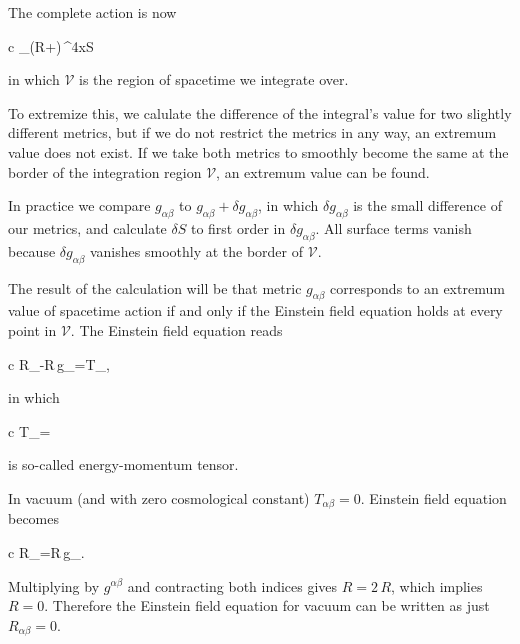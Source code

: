\documentclass[11pt,oneside%
]{memoir}
\newenvironment{eqna}{\begin{IEEEeqnarray*}{c}}{\end{IEEEeqnarray*}\ignorespacesafterend}
\newcommand{\dd}{\mathrm{d}}
\begin{document}
The complete action is now
\begin{eqna}
\int_(R+)\,\dd^4x\doteq S
\end{eqna}
in which \(\mathcal{V}\) is the region of spacetime we integrate over.


To extremize this, we calulate the difference of the integral's value for two slightly different metrics, but if we do not restrict the metrics in any way, an extremum value does not exist. If we take both metrics to smoothly become the same at the border of the integration region \(\mathcal{V}\), an extremum value can be found.

In practice we compare \(g_{\alpha\beta}\) to \(g_{\alpha\beta}+\delta g_{\alpha\beta}\), in which \(\delta g_{\alpha\beta}\) is the small difference of our metrics, and calculate \(\delta S\) to first order in \(\delta g_{\alpha\beta}\). All surface terms vanish because \(\delta g_{\alpha\beta}\) vanishes smoothly at the border of \(\mathcal{V}\).






The result of the calculation will be that metric \(g_{\alpha\beta}\) corresponds to an extremum value of spacetime action if and only if the Einstein field equation holds at every point in \(\mathcal{V}\). The Einstein field equation reads
\begin{eqna}
R_{\alpha\beta}-R\,g_{\alpha\beta}=T_{\alpha\beta},%
\end{eqna}
in which
\begin{eqna}
T_{\alpha\beta}=
\end{eqna}
is so-called energy-momentum tensor.

In vacuum (and with zero cosmological constant) \(T_{\alpha\beta}=0\). Einstein field equation becomes
\begin{eqna}
R_{\alpha\beta}=R\,g_{\alpha\beta}.
\end{eqna}
Multiplying by \(g^{\alpha\beta}\) and contracting both indices gives \(R=2\,R\), which implies \(R=0\). Therefore the Einstein field equation for vacuum can be written as just \(R_{\alpha\beta}=0\).




\end{document}
